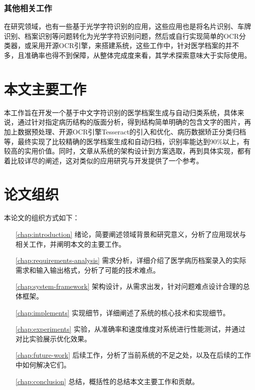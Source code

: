 \subsubsection{其他相关工作}
在研究领域，也有一些基于光学字符识别的应用\citep{SongWan, HongfengLi, TikunHu}，这些应用也是将名片识别、车牌识别、档案识别等问题转化为光学字符识别问题，然后或自行实现简单的OCR分类器，或采用开源OCR引擎，来搭建系统，这些工作中，针对医学档案的并不多\citep{MinghuaXiang}，且准确率也得不到保障，从整体完成度来看，其学术探索意味大于实际使用。

\section{本文主要工作}
本工作旨在开发一个基于中文字符识别的医学档案生成与自动归类系统，具体来说，通过针对指定病历结构的版面分析，得到结构简单明确的包含文字的图片，再加上数据预处理、开源OCR引擎Tesseract的引入和优化、病历数据矫正分类归档等，最终实现了比较精确的医学档案生成和自动归档，识别率能达到90\%以上，有较高的实用价值。同时，文章从系统的架构设计到方案选取，再到具体实现，都有着比较详尽的阐述，这对类似的应用研究与开发提供了一个参考。

\section{论文组织}
本论文的组织方式如下：
\begin{itemize}
	\item[\autoref{chap:introduction}] 
	绪论，简要阐述领域背景和研究意义，分析了应用现状与相关工作，并阐明本文的主要工作。
	\item[\autoref{chap:requirements-analysis}] 需求分析，详细介绍了医学病历档案录入的实际需求和输入输出格式，分析了可能的技术难点。
	\item[\autoref{chap:system-framework}] 
	架构设计，从需求出发，针对问题难点设计合理的总体框架。
	\item[\autoref{chap:implements}] 
	实现细节，详细阐述了系统的核心技术和实现细节。
	\item[\autoref{chap:experiments}]
	实验，从准确率和速度维度对系统进行性能测试，并通过对比实验展示优化效果。
	\item[\autoref{chap:future-work}]
	后续工作，分析了当前系统的不足之处，以及在后续的工作中如何解决它们。
	\item[\autoref{chap:conclusion}]
	总结，概括性的总结本文主要工作和贡献。
\end{itemize}